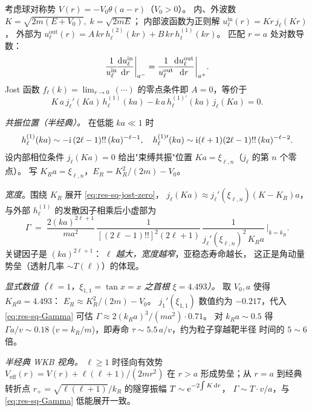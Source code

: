 \begin{example}\label{ex:res-square-well}
  考虑球对称势 $V(r)=-V_0\theta(a-r)$（$V_0>0$）。
  内、外波数
  $K=\sqrt{2m(E+V_0)},\;k=\sqrt{2mE}$；
  内部波函数为正则解 $u_\ell^{\mathrm{in}}(r)=K r\,j_\ell(K r)$，
  外部为 $u_\ell^{\mathrm{out}}(r)=A\,k r\,h_\ell^{(2)}(kr)+B\,k r\,h_\ell^{(1)}(kr)$。
  匹配 $r=a$ 处对数导数：
  \begin{equation}\label{eq:res-sq-match}
    \frac{1}{u_\ell^{\mathrm{in}}}\!\frac{\mathrm{d} u_\ell^{\mathrm{in}}}{\mathrm{d} r}\bigg|_{a^-}
    =
    \frac{1}{u_\ell^{\mathrm{out}}}\!\frac{\mathrm{d} u_\ell^{\mathrm{out}}}{\mathrm{d} r}\bigg|_{a^+}.
  \end{equation}
  Jost 函数 $f_\ell(k)=\lim_{r\to 0}\,(\cdots)$ 的零点条件即
  $A=0$，等价于
  \begin{equation}\label{eq:res-sq-jost-zero}
    K\,a\,j_\ell'(Ka)\,h_\ell^{(1)}(ka)
    -k\,a\,h_\ell^{(1)\prime}(ka)\,j_\ell(Ka)=0.
  \end{equation}

  \emph{共振位置（半经典）。}
  在低能 $ka\ll 1$ 时
  \begin{equation*}
    h_\ell^{(1)}(ka)\sim -\mathrm{i}\,(2\ell-1)!!\,(ka)^{-\ell-1},\quad
    h_\ell^{(1)\prime}(ka)\sim \mathrm{i}(\ell+1)(2\ell-1)!!\,(ka)^{-\ell-2}.
  \end{equation*}
  设内部相位条件 $j_\ell(Ka)=0$ 给出"束缚共振"位置
  $K a=\xi_{\ell,n}$（$j_\ell$ 的第 $n$ 个零点）。
  写 $K_R a=\xi_{\ell,n}$，$E_R=K_R^2/(2m)-V_0$。

  \emph{宽度}。围绕 $K_R$ 展开 \eqref{eq:res-sq-jost-zero}，
  $j_\ell(Ka)\approx j_\ell'(\xi_{\ell,n})(K-K_R)a$，与外部 $h^{(1)}_\ell$
  的发散因子相乘后小虚部为
  \begin{equation}\label{eq:res-sq-Gamma}
    \boxed{\;\Gamma\;=\;\frac{2(ka)^{2\ell+1}}{m a^2}\,
      \frac{1}{[(2\ell-1)!!]^2(2\ell+1)}\,
      \frac{1}{j_\ell'(\xi_{\ell,n})^2\,K_R a}\,
      \Big|_{k=k_R}.\;}
  \end{equation}
  关键因子是 $(ka)^{2\ell+1}$：
  \emph{$\ell$ 越大，宽度越窄}，亚稳态寿命越长，
  这正是角动量势垒（透射几率 $\sim T(\ell)$）的体现。

  \emph{显式数值（$\ell=1$，$\xi_{1,1}=\tan x=x$ 之首根 $\xi=4.493$）。}
  取 $V_0,a$ 使得 $K_R a=4.493$：
  $E_R\approx K_R^2/(2m)-V_0$。
  $j_1'(\xi_{1,1})$ 数值约为 $-0.217$，代入
  \eqref{eq:res-sq-Gamma} 可估
  $\Gamma\approx 2(k_R a)^3/(ma^2)\cdot 0.71$。
  对 $k_R a\sim 0.5$ 得 $\Gamma a/v\sim 0.18$
  ($v=k_R/m$)，即寿命 $\tau\sim 5.5\,a/v$，约为粒子穿越靶半径
  时间的 $5\sim 6$ 倍。

  \emph{半经典 WKB 视角。}
  $\ell\geq 1$ 时径向有效势
  $V_{\mathrm{eff}}(r)=V(r)+\ell(\ell+1)/(2mr^2)$
  在 $r>a$ 形成势垒；从 $r=a$ 到经典转折点 $r_+=\sqrt{\ell(\ell+1)}/k_R$
  的隧穿振幅 $T\sim \mathrm{e}^{-2\!\int K\,\mathrm{d} r}$，
  $\Gamma\sim T\cdot v/a$，与 \eqref{eq:res-sq-Gamma}
  低能展开一致。
\end{example}

